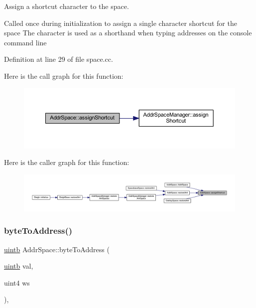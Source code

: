 Assign a shortcut character to the space. 

Called once during initialization to assign a single character shortcut for the space The character is used as a shorthand when typing addresses on the console command line 

Definition at line 29 of file space.\+cc.

Here is the call graph for this function\+:
\nopagebreak
\begin{figure}[H]
\begin{center}
\leavevmode
\includegraphics[width=350pt]{class_addr_space_a7ffd0df8a2d71013ec0a9b572bd549d9_cgraph}
\end{center}
\end{figure}
Here is the caller graph for this function\+:
\nopagebreak
\begin{figure}[H]
\begin{center}
\leavevmode
\includegraphics[width=350pt]{class_addr_space_a7ffd0df8a2d71013ec0a9b572bd549d9_icgraph}
\end{center}
\end{figure}
\mbox{\label{class_addr_space_a3c9149df492bdcaccc208eac261e8365}} 
\subsubsection{\texorpdfstring{byteToAddress()}{byteToAddress()}}
{\footnotesize\ttfamily \mbox{\hyperlink{types_8h_a2db313c5d32a12b01d26ac9b3bca178f}{uintb}} Addr\+Space\+::byte\+To\+Address (\begin{DoxyParamCaption}\item[{\mbox{\hyperlink{types_8h_a2db313c5d32a12b01d26ac9b3bca178f}{uintb}}}]{val,  }\item[{uint4}]{ws }\end{DoxyParamCaption})\hspace{0.3cm}{\ttfamily [inline]}, {\ttfamily [static]}}



